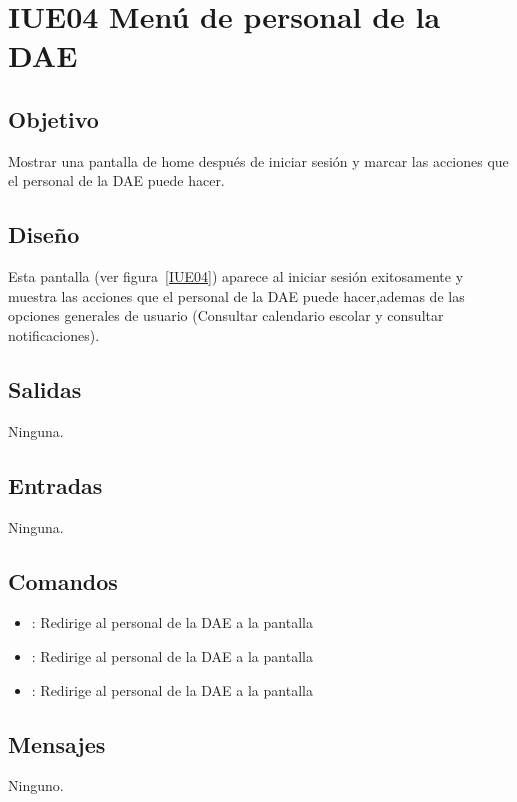 \section{IUE04 Menú de personal de la DAE}

\subsection{Objetivo}
Mostrar una pantalla de home después de iniciar sesión y marcar las acciones que el personal de la DAE puede hacer.

\subsection{Diseño}
Esta pantalla  (ver figura~\ref{IUE04}) aparece al iniciar sesión exitosamente y muestra las acciones que el personal de la DAE puede hacer,ademas de las opciones generales de usuario (Consultar calendario escolar y consultar notificaciones). 


\subsection{Salidas}

Ninguna.

\subsection{Entradas}
Ninguna.

\subsection{Comandos}
\begin{itemize}
	\item {}: Redirige al personal de la DAE a la pantalla 
	\item {}: Redirige al personal de la DAE a la pantalla 
	\item {}: Redirige al personal de la DAE a la pantalla 
	
\end{itemize}

\subsection{Mensajes}

\begin{Citemize}
	\item Ninguno.
\end{Citemize}

